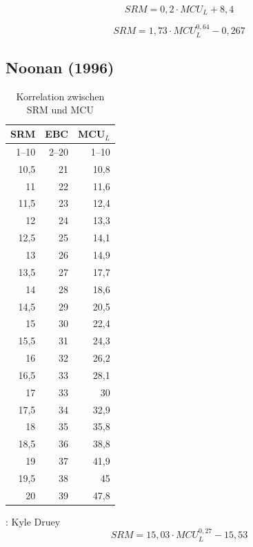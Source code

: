 \documentclass[a4paper,parskip=half]{scrartcl}
\newcommand{\MCUL}{\mathit{MCU}_{L}}
\newcommand{\SRM}{\mathit{SRM}}
\begin{document}
\begin{equation}
\SRM = 0,2 \cdot \MCUL + 8,4
\label{eq:mcudaniels}
\end{equation}

\begin{equation}
\SRM = 1,73 \cdot \MCUL^{0,64} - 0,267
\label{eq:mcudanielsdruey}
\end{equation}

\subsection*{Noonan (1996)}

\begin{table}[H]
\centering
\begin{tabular}{rrr}
\toprule
\multicolumn{1}{c}{\textbf{SRM}} & \multicolumn{1}{c}{\textbf{EBC}} & \multicolumn{1}{c}{\textbf{MCU$_L$}} \\
\midrule
1–10 & 2–20 & 1–10 \\
10,5 & 21 & 10,8 \\
11   & 22 & 11,6 \\
11,5 & 23 & 12,4 \\
12   & 24 & 13,3 \\
12,5 & 25 & 14,1 \\
13   & 26 & 14,9 \\
13,5 & 27 & 17,7 \\
14   & 28 & 18,6 \\
14,5 & 29 & 20,5 \\
15   & 30 & 22,4 \\
15,5 & 31 & 24,3 \\
16   & 32 & 26,2 \\
16,5 & 33 & 28,1 \\
17   & 33 & 30 \\
17,5 & 34 & 32,9 \\
18   & 35 & 35,8 \\
18,5 & 36 & 38,8 \\
19   & 37 & 41,9 \\
19,5 & 38 & 45 \\
20   & 39 & 47,8 \\
\bottomrule
\end{tabular}
\caption{Korrelation zwischen SRM und MCU \parencite[206]{Noonan1996}}
\label{table:mcunoonan}
\end{table}

\parencite{Druey1998}:
Kyle Druey
\begin{equation}
\SRM = 15,03 \cdot \MCUL^{0,27} - 15,53
\label{eq:mcunoonandruey}
\end{equation}
\end{document}
